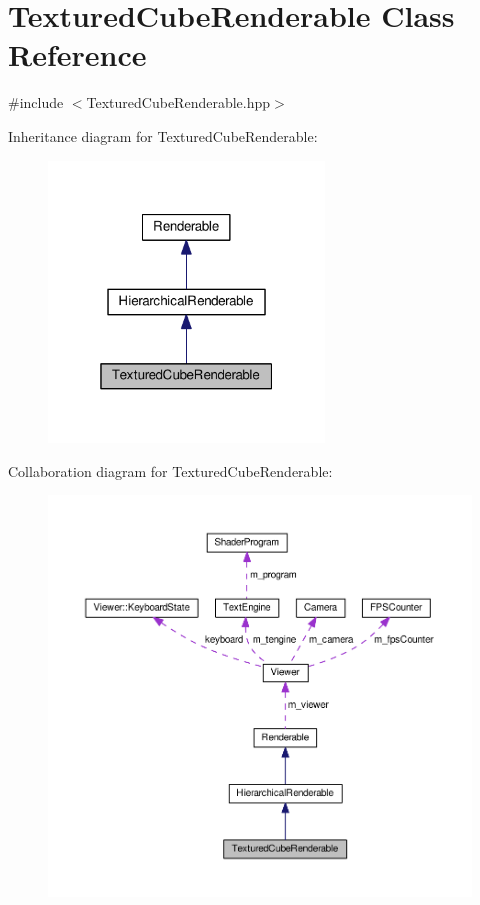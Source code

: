 \hypertarget{classTexturedCubeRenderable}{\section{Textured\+Cube\+Renderable Class Reference}
\label{classTexturedCubeRenderable}
}


{\ttfamily \#include $<$Textured\+Cube\+Renderable.\+hpp$>$}



Inheritance diagram for Textured\+Cube\+Renderable\+:\nopagebreak
\begin{figure}[H]
\begin{center}
\leavevmode
\includegraphics[width=208pt]{classTexturedCubeRenderable__inherit__graph}
\end{center}
\end{figure}


Collaboration diagram for Textured\+Cube\+Renderable\+:\nopagebreak
\begin{figure}[H]
\begin{center}
\leavevmode
\includegraphics[width=350pt]{classTexturedCubeRenderable__coll__graph}
\end{center}
\end{figure}
